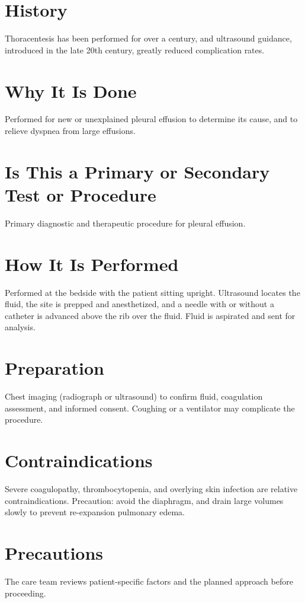 \section*{History}
Thoracentesis has been performed for over a century, and ultrasound guidance, introduced in the late 20th century, greatly reduced complication rates.

\section*{Why It Is Done}
Performed for new or unexplained pleural effusion to determine its cause, and to relieve dyspnea from large effusions.

\section*{Is This a Primary or Secondary Test or Procedure}
Primary diagnostic and therapeutic procedure for pleural effusion.

\section*{How It Is Performed}
Performed at the bedside with the patient sitting upright. Ultrasound locates the fluid, the site is prepped and anesthetized, and a needle with or without a catheter is advanced above the rib over the fluid. Fluid is aspirated and sent for analysis.

\section*{Preparation}
Chest imaging (radiograph or ultrasound) to confirm fluid, coagulation assessment, and informed consent. Coughing or a ventilator may complicate the procedure.

\section*{Contraindications}
Severe coagulopathy, thrombocytopenia, and overlying skin infection are relative contraindications. Precaution: avoid the diaphragm, and drain large volumes slowly to prevent re-expansion pulmonary edema.

\section*{Precautions}
The care team reviews patient-specific factors and the planned approach before proceeding.

